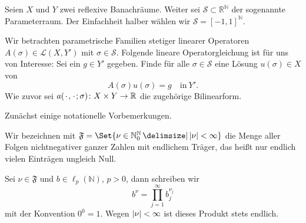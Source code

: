 Seien $X$ und $Y$ zwei reflexive Banachräume.
Weiter sei $\mathcal S \subset \mathbb{R}^{\mathbb{N}}$ der sogenannte Parameterraum.
Der Einfachheit halber wählen wir $\mathcal S = [-1, 1]^{\mathbb{N}}$.

Wir betrachten parametrische Familien stetiger linearer Operatoren $A(\sigma) \in \mathcal L(X, Y')$ mit $\sigma \in \mathcal S$.
Folgende lineare Operatorgleichung ist für uns von Interesse:
Sei ein $g \in Y'$ gegeben.
Finde für alle $\sigma \in \mathcal S$ eine Lösung $u(\sigma) \in X$ von
\begin{equation}
    \label{eq:allgemeine_parametrische_elliptische_pde}
    A(\sigma) u(\sigma) = g \quad \text{in}~Y'.
\end{equation}
Wie zuvor sei $a({\mkern2mu\cdot\mkern2mu}, {\mkern2mu\cdot\mkern2mu}; \sigma) \colon X \times Y \to \mathbb{R}$ die zugehörige Bilinearform.

Zunächst einige notationelle Vorbemerkungen.
\begin{Bemerkung}
    Wir bezeichnen mit $\mathfrak F = \Set{ \nu \in \mathbb{N}^{\mathbb{N}}_{0} \given \abs{\nu} < \infty }$ die Menge aller Folgen nichtnegativer ganzer Zahlen mit endlichem Träger, das heißt nur endlich vielen Einträgen ungleich Null.

    Sei $\nu \in \mathfrak F$ und $b \in \ell_{p}(\mathbb{N})$, $p > 0$, dann schreiben wir
    \begin{equation}
        b^{\nu} = \prod_{j = 1}^{\infty} b_{j}^{\nu_{j}}
    \end{equation}
    mit der Konvention $0^{0} = 1$.
    Wegen $\lvert\nu\rvert < \infty$ ist dieses Produkt stets endlich.
\end{Bemerkung}

